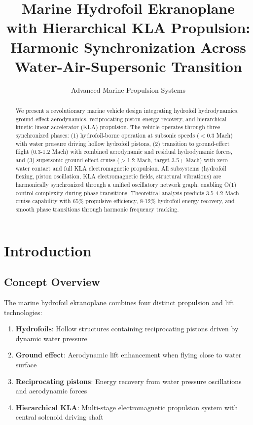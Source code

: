 \documentclass[12pt,a4paper]{article}
\title{Marine Hydrofoil Ekranoplane with Hierarchical KLA Propulsion:\\
Harmonic Synchronization Across Water-Air-Supersonic Transition}
\author{Advanced Marine Propulsion Systems}
\begin{document}
\maketitle

\begin{abstract}
We present a revolutionary marine vehicle design integrating hydrofoil hydrodynamics, ground-effect aerodynamics, reciprocating piston energy recovery, and hierarchical kinetic linear accelerator (KLA) propulsion. The vehicle operates through three synchronized phases: (1) hydrofoil-borne operation at subsonic speeds ($<$0.3 Mach) with water pressure driving hollow hydrofoil pistons, (2) transition to ground-effect flight (0.3-1.2 Mach) with combined aerodynamic and residual hydrodynamic forces, and (3) supersonic ground-effect cruise ($>$1.2 Mach, target 3.5+ Mach) with zero water contact and full KLA electromagnetic propulsion. All subsystems (hydrofoil flexing, piston oscillation, KLA electromagnetic fields, structural vibrations) are harmonically synchronized through a unified oscillatory network graph, enabling O(1) control complexity during phase transitions. Theoretical analysis predicts 3.5-4.2 Mach cruise capability with 65\% propulsive efficiency, 8-12\% hydrofoil energy recovery, and smooth phase transitions through harmonic frequency tracking.
\end{abstract}

\section{Introduction}

\subsection{Concept Overview}

The marine hydrofoil ekranoplane combines four distinct propulsion and lift technologies:

\begin{enumerate}
\item \textbf{Hydrofoils}: Hollow structures containing reciprocating pistons driven by dynamic water pressure
\item \textbf{Ground effect}: Aerodynamic lift enhancement when flying close to water surface
\item \textbf{Reciprocating pistons}: Energy recovery from water pressure oscillations and aerodynamic forces
\item \textbf{Hierarchical KLA}: Multi-stage electromagnetic propulsion system with central solenoid driving shaft
\end{enumerate}
\end{document}
